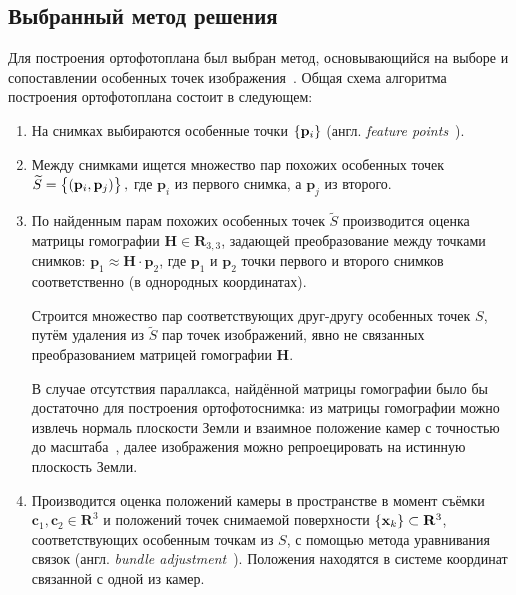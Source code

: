 \documentclass[a4paper,12pt]{article}
\begin{document}
\subsection{Выбранный метод решения}
Для построения ортофотоплана был выбран метод, основывающийся на выборе и 
сопоставлении особенных точек изображения~\cite{cham98matchframework, brown03recognising, mclauchlan02mosaic}.
Общая схема алгоритма построения ортофотоплана состоит в следующем:
\begin{enumerate}
  \item На снимках выбираются особенные точки $\cbr{ \mathbf{p}_i }$ 
  (англ. \emph{feature points}~\cite{cham98matchframework}).
  
  \item Между снимками ищется множество пар похожих особенных 
  точек $\widetilde{S} = \cbr{(\mathbf{p}_i, \mathbf{p}_j )},$
  где $\mathbf{p}_i$ из первого снимка, а $\mathbf{p}_j$ из второго.
  
  \item По найденным парам похожих особенных точек $\widetilde{S}$ производится 
  оценка матрицы гомографии $\mathbf{H} \in \mathbf{R}_{3, 3}$, 
  задающей преобразование между точками снимков: 
  $\mathbf{p}_1 \approx \mathbf{H} \cdot \mathbf{p}_2$, 
  где $\mathbf{p}_1$ и $\mathbf{p}_2$ точки первого и второго снимков 
  соответственно (в однородных координатах). 
  
  Строится множество пар соответствующих друг-другу особенных точек $S$, путём
  удаления из $\widetilde{S}$ пар точек изображений, явно не связанных
  преобразованием матрицей гомографии $\mathbf{H}$.
  
  В случае отсутствия параллакса, найдённой матрицы гомографии было бы достаточно 
  для построения ортофотоснимка: из матрицы гомографии можно извлечь нормаль 
  плоскости Земли и взаимное положение камер с точностью до масштаба~\cite{malis07homodecomp}, 
  далее изображения можно репроецировать на истинную плоскость Земли.
  
  \item Производится оценка положений камеры в пространстве в момент съёмки
  $\mathbf{c}_1, \mathbf{c}_2 \in \mathbf{R}^3$ и
  положений точек снимаемой поверхности $\cbr{ \mathbf{x}_k } \subset \mathbf{R}^3$,
  соответствующих особенным точкам из $S$, с помощью метода уравнивания
  связок (англ. \emph{bundle adjustment}~\cite{triggs00ba}).
  Положения находятся в системе координат связанной с одной из камер.
  

\end{enumerate}
\end{document}

